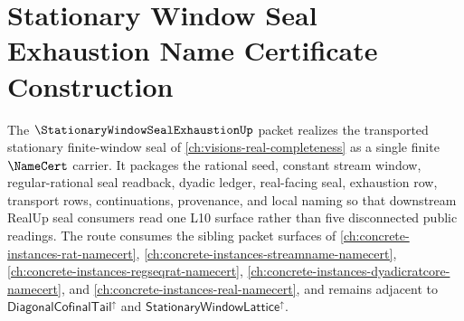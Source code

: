 \chapter{Stationary Window Seal Exhaustion Name Certificate Construction}
\label{ch:concrete-instances-stationary-window-seal-exhaustion-namecert}

The $\StationaryWindowSealExhaustionUp$ packet realizes the transported stationary finite-window seal of \autoref{ch:visions-real-completeness} as a single finite $\NameCert$ carrier. It packages the rational seed, constant stream window, regular-rational seal readback, dyadic ledger, real-facing seal, exhaustion row, transport rows, continuations, provenance, and local naming so that downstream RealUp seal consumers read one L10 surface rather than five disconnected public readings. The route consumes the sibling packet surfaces of \autoref{ch:concrete-instances-rat-namecert}, \autoref{ch:concrete-instances-streamname-namecert}, \autoref{ch:concrete-instances-regseqrat-namecert}, \autoref{ch:concrete-instances-dyadicratcore-namecert}, and \autoref{ch:concrete-instances-real-namecert}, and remains adjacent to $\mathsf{DiagonalCofinalTail}^{\uparrow}$ and $\mathsf{StationaryWindowLattice}^{\uparrow}$.

